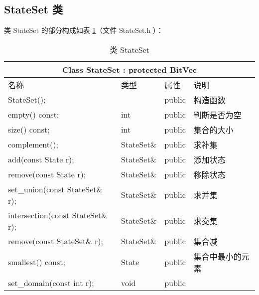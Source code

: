\subsection{StateSet 类}
类 StateSet 的部分构成如表 \ref{tab:Class-StateSet}（文件 StateSet.h ）：
    

\begin{table}[!htbp]
    \caption{类 StateSet}
    \label{tab:Class-StateSet}
    \centering
    \small%
    \setlength{\tabcolsep}{4pt}%
    \renewcommand{\arraystretch}{1.2}%
        \begin{tabular}{llll} %
        \toprule 
         \multicolumn{4}{c}{Class StateSet : protected BitVec} \\
        \midrule
        名称& 类型 & 属性  &\mbox{说明} \\
        \midrule 
        StateSet(); &  &  public & 构造函数 \\
        empty() const; & int & public & 判断是否为空\\
        size() const;  & int & public & 集合的大小\\
        complement();  & StateSet\& & public & 求补集 \\
        add(const State r);  & StateSet\& & public & 添加状态 \\
        remove(const State r);  & StateSet\& & public & 移除状态 \\
        set\_union(const StateSet\& r);  & StateSet\& & public & 求并集 \\
        intersection(const StateSet\& r);  & StateSet\& & public & 求交集 \\
        remove(const StateSet\& r);  & StateSet\& & public & 集合减 \\
        smallest() const; & State & public & 集合中最小的元素 \\
        set\_domain(const int r); & void & public & \\
        \bottomrule 
    \end{tabular}
\end{table}

